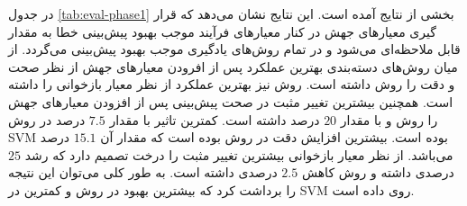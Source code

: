 در جدول \ref{tab:eval-phase1} بخشی از نتایج آمده است. این نتایج نشان می‌دهد که قرار گیری معیارهای جهش در کنار معیارهای فرآیند موجب بهبود پیش‌بینی خطا به مقدار قابل ملاحظه‌ای می‌شود و در تمام  روش‌های  یادگیری موجب بهبود  پیش‌بینی می‌گردد. از میان روش‌های دسته‌بندی بهترین عملکرد   پس از افرودن معیارهای جهش  از نظر صحت و دقت را روش  داشته است. روش    نیز بهترین عملکرد از نظر معیار بازخوانی را  داشته است. همچنین بیشترین تغییر مثبت در صحت پیش‌بینی پس از افزودن معیارهای جهش را روش    و   با مقدار $20$ درصد داشته است.  کمترین تاثیر با مقدار $7.5$ درصد در روش SVM بوده است. بیشترین افزایش دقت در روش  بوده است که مقدار آن $15.1$ درصد می‌باشد. از نظر معیار بازخوانی بیشترین تغییر مثبت را درخت تصمیم دارد که رشد $25$ درصدی داشته و روش  کاهش $2.5$ درصدی داشته است. به طور کلی می‌توان این نتیجه را برداشت کرد که بیشترین بهبود در روش  و کمترین در SVM روی داده است.

